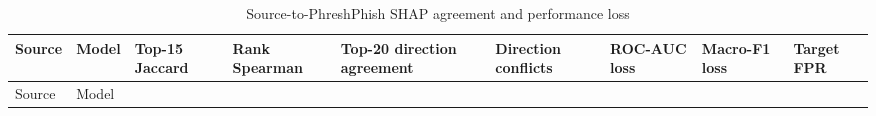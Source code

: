 \documentclass[
  10pt,
]{article}
\begin{document}
\begin{longtable}[]{@{}
  >{\raggedright\arraybackslash}p{}
  >{\raggedright\arraybackslash}p{}
  >{\raggedleft\arraybackslash}p{}
  >{\raggedleft\arraybackslash}p{}
  >{\raggedleft\arraybackslash}p{}
  >{\raggedleft\arraybackslash}p{}
  >{\raggedleft\arraybackslash}p{}
  >{\raggedleft\arraybackslash}p{}
  >{\raggedleft\arraybackslash}p{}@{}}
\caption{Source-to-PhreshPhish SHAP agreement and performance
loss}\tabularnewline
\toprule\noalign{}
\begin{minipage}[b]{\linewidth}\raggedright
Source
\end{minipage} & \begin{minipage}[b]{\linewidth}\raggedright
Model
\end{minipage} & \begin{minipage}[b]{\linewidth}\raggedleft
Top-15 Jaccard
\end{minipage} & \begin{minipage}[b]{\linewidth}\raggedleft
Rank Spearman
\end{minipage} & \begin{minipage}[b]{\linewidth}\raggedleft
Top-20 direction agreement
\end{minipage} & \begin{minipage}[b]{\linewidth}\raggedleft
Direction conflicts
\end{minipage} & \begin{minipage}[b]{\linewidth}\raggedleft
ROC-AUC loss
\end{minipage} & \begin{minipage}[b]{\linewidth}\raggedleft
Macro-F1 loss
\end{minipage} & \begin{minipage}[b]{\linewidth}\raggedleft
Target FPR
\end{minipage} \\
\midrule\noalign{}
\endfirsthead
\toprule\noalign{}
\begin{minipage}[b]{\linewidth}\raggedright
Source
\end{minipage} & \begin{minipage}[b]{\linewidth}\raggedright
Model
\end{minipage} & \begin{minipage}[b]{\linewidth}\raggedleft

\end{minipage}
\end{longtable}
\end{document}
